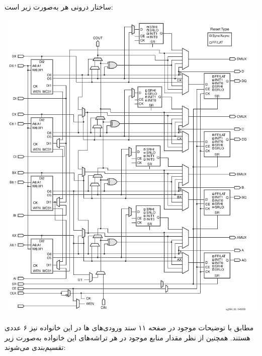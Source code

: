 \begin{qsolve}
	ساختار درونی هر  به‌صورت زیر است:
	
	\begin{center}
		\includegraphics*[width=1\linewidth]{pics/img10.png}
		\label{ساختار درونی CLB ها در Virtex}
	\end{center}
	
	
	مطابق با توضیحات موجود در صفحه ۱۱ سند \cite{ref3} ورودی‌های  ها در این خانواده نیز ۶ عددی هستند. همچنین از نظر مقدار منابع موجود در هر  تراشه‌های این خانواده به‌صورت زیر تقسیم‌بندی می‌شوند:
\end{qsolve}



